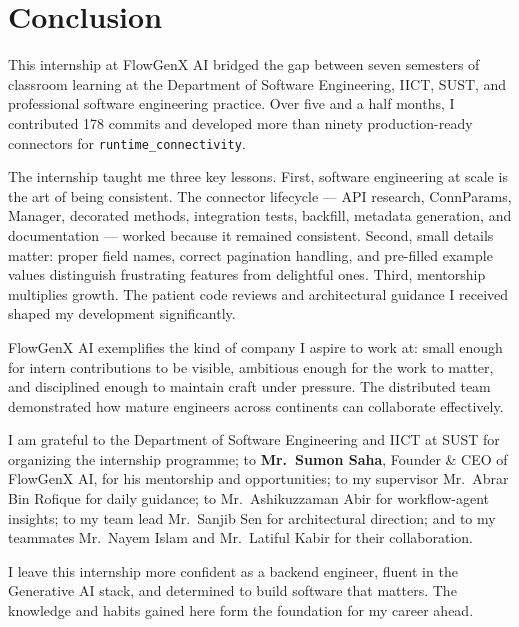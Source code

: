 \chapter{Conclusion}
\label{ch:conclusion}

This internship at FlowGenX AI bridged the gap between seven semesters of classroom learning at the Department of Software Engineering, IICT, SUST, and professional software engineering practice. Over five and a half months, I contributed 178 commits and developed more than ninety production-ready connectors for \texttt{runtime\_connectivity}.

\vspace{0.2cm}

The internship taught me three key lessons. First, software engineering at scale is the art of being consistent. The connector lifecycle --- API research, ConnParams, Manager, decorated methods, integration tests, backfill, metadata generation, and documentation --- worked because it remained consistent. Second, small details matter: proper field names, correct pagination handling, and pre-filled example values distinguish frustrating features from delightful ones. Third, mentorship multiplies growth. The patient code reviews and architectural guidance I received shaped my development significantly.

\vspace{0.2cm}

FlowGenX AI exemplifies the kind of company I aspire to work at: small enough for intern contributions to be visible, ambitious enough for the work to matter, and disciplined enough to maintain craft under pressure. The distributed team demonstrated how mature engineers across continents can collaborate effectively.

\vspace{0.2cm}

I am grateful to the Department of Software Engineering and IICT at SUST for organizing the internship programme; to \textbf{Mr.~Sumon Saha}, Founder \& CEO of FlowGenX AI, for his mentorship and opportunities; to my supervisor Mr.~Abrar Bin Rofique for daily guidance; to Mr.~Ashikuzzaman Abir for workflow-agent insights; to my team lead Mr.~Sanjib Sen for architectural direction; and to my teammates Mr.~Nayem Islam and Mr.~Latiful Kabir for their collaboration.

\vspace{0.2cm}

I leave this internship more confident as a backend engineer, fluent in the Generative AI stack, and determined to build software that matters. The knowledge and habits gained here form the foundation for my career ahead.
